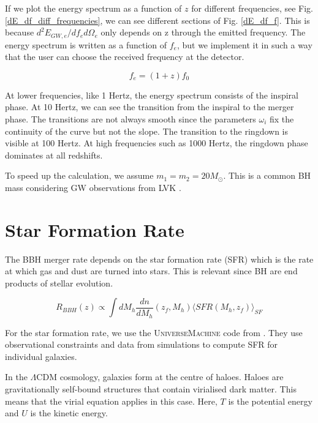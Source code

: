 If we plot the energy spectrum as a function of $z$ for different frequencies, see Fig. \ref{dE_df_diff_frequencies}, we can see different sections of Fig. \ref{dE_df_f}. This is because $d^2 E_{GW,e}/df_e d\Omega_e$ only depends on z through the emitted frequency. The energy spectrum is written as a function of $f_e$, but we implement it in such a way that the user can choose the received frequency at the detector.

\begin{equation}
    f_e = (1+z)f_0
\end{equation}

At lower frequencies, like 1 Hertz, the energy spectrum consists of the inspiral phase. At 10 Hertz, we can see the transition from the inspiral to the merger phase. The transitions are not always smooth since the parameters $\omega_i$ fix the continuity of the curve but not the slope. The transition to the ringdown is visible at 100 Hertz. At high frequencies such as 1000 Hertz, the ringdown phase dominates at all redshifts.

To speed up the calculation, we assume $m_1 = m_2 = 20M_\odot$. This is a common BH mass considering GW observations from LVK \cite{the_ligo_scientific_collaboration_population_2022}.

\section{Star Formation Rate}

The BBH merger rate depends on the star formation rate (SFR) which is the rate at which gas and dust are turned into stars. This is relevant since BH are end products of stellar evolution.

\begin{equation}
    R_{BBH}(z) \propto \int dM_h \frac{dn}{dM_h}(z_f, M_h)\langle SFR(M_h, z_f)\rangle_{SF}
\end{equation}


For the star formation rate, we use the \textsc{UniverseMachine} code from \cite{behroozi_universemachine_2019}. They use observational constraints and data from simulations to compute SFR for individual galaxies.

In the $\Lambda$CDM cosmology, galaxies form at the centre of haloes. Haloes are gravitationally self-bound structures that contain virialised dark matter. This means that the virial equation applies in this case. Here, $T$ is the potential energy and $U$ is the kinetic energy.

